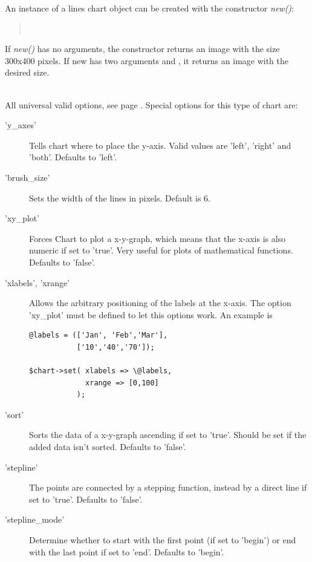 \begin{Constructor} 
An instance of a lines chart object can be created with the constructor \textit{new()}:
\begin{quote}
\\
\end{quote}
If \textit{new()} has no arguments, 
the constructor returns an image with the size 300x400 pixels. If new has two arguments
 and , it returns an image with the desired size.
\end{Constructor}

\Methods
{}\\[\parabstand]
%
\Attributes
All universal valid options, see page \pageref{options}. 
Special options for this type of chart are:\\
\begin{description}
\item['y\_axes'] Tells chart where to place the y-axis. 
                 Valid values are 'left', 'right' and 'both'. Defaults to 'left'.

\item['brush\_size'] Sets the width of the lines in pixels. Default is 6.

\item['xy\_plot'] Forces Chart to plot a x-y-graph, which means that the x-axis 
                  is also numeric if set to 'true'. 
                  Very useful for plots of mathematical functions. Defaults to 'false'.

\item['xlabels', 'xrange'] Allows the arbitrary positioning of the labels at the
                  x-axis. The option 'xy\_plot' must be defined to let this
                  options work. An example is
                  \begin{verbatim}
@labels = (['Jan', 'Feb','Mar'], 
           ['10','40','70']); 

$chart->set( xlabels => \@labels, 
             xrange => [0,100] 
           ); 
                   \end{verbatim}

\item['sort'] Sorts the data of a x-y-graph ascending if set to 'true'. 
              Should be set if the added data isn't sorted. Defaults to 'false'.   

\item['stepline'] The points are connected by a stepping function,
                  instead by a direct line if set to 'true'. 
                  Defaults to 'false'.   

\item['stepline\_mode'] Determine whether to start with the first point
                    (if set to 'begin') or end with the last point if set to 'end'.
                    Defaults to 'begin'.   
\end{description}


